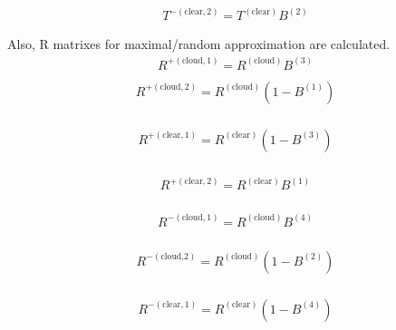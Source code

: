 \begin{equation}
\begin{array}{l}
T^{-(\text {clear}, 2)}=T^{(\text {clear})} B^{(2)}
\end{array}
\end{equation}

Also, R matrixes for maximal/random approximation are calculated. \begin{equation}
\begin{array}{l}
R^{+(\text {cloud}, 1)}=R^{(\text {cloud})} B^{(3)} \\
\end{array}
\end{equation} \begin{equation}
\begin{array}{l}
R^{+(\text {cloud}, 2)}=R^{(\text {cloud})}\left(1-B^{(1)}\right) \\
\end{array}
\end{equation}

\begin{equation}
\begin{array}{l}
R^{+(\text {clear}, 1)}=R^{(\text {clear})}\left(1-B^{(3)}\right) \\
\end{array}
\end{equation}

\begin{equation}
\begin{array}{l}
R^{+(\text {clear}, 2)}=R^{(\text {clear})} B^{(1)} \\
\end{array}
\end{equation}

\begin{equation}
\begin{array}{l}
R^{-(\text {cloud}, 1)}=R^{(\text {cloud})} B^{(4)} \\
\end{array}
\end{equation}

\begin{equation}
\begin{array}{l}
R^{-(\text {cloud,2})}=R^{(\text {cloud})}\left(1-B^{(2)}\right) \\
\end{array}
\end{equation}

\begin{equation}
\begin{array}{l}
R^{-(\text {clear}, 1)}=R^{(\text {clear})}\left(1-B^{(4)}\right) \\
\end{array}
\end{equation}

